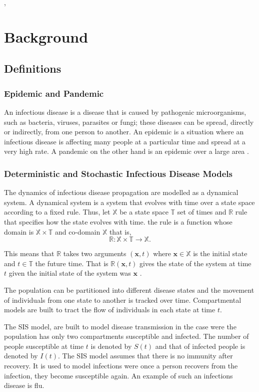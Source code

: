 ,\chapter{Background}

\section{Definitions}
\subsection{Epidemic and Pandemic }
An infectious disease is a disease that is caused by pathogenic microorganisms, such as bacteria, viruses, parasites or fungi; these diseases can be spread, directly or indirectly, from one person to another. An epidemic is a situation where an infectious disease is affecting many people at a particular time and spread at a very high rate. A pandemic on the other hand
is an epidemic over a large area \citep{morens2009pandemic}.

\subsection{Deterministic and Stochastic Infectious Disease Models}
The dynamics of infectious disease propagation are modelled as a dynamical system. A dynamical system is a system that evolves with time over a state space according to a fixed rule. Thus, let $\mathbb{X}$ be a state space $\mathbb{T}$ set of times and $\mathbb{R}$ rule that specifies how the state evolves with time. the rule is a function  whose domain is $\mathbb{X} \times  \mathbb{T}$ and co-domain $\mathbb{X}$ that is,
\begin{equation*}
\mathbb{R}: \mathbb{X}  \times \mathbb{T} \longrightarrow \mathbb{X}.
\end{equation*}

This means that $\mathbb{R}$ takes two arguments $ (\textbf{x},t)$ where $\textbf{x} \in \mathbb{X}$ is the initial state and $t \in \mathbb{T}$ the future time. That is $\mathbb{R} (\textbf{x},t)$ gives the state of the system at time $t$ given the initial state of the system was $\textbf{x}$ \citep{DQ}.

The population can be partitioned into different disease states and the movement of individuals from one state to another is tracked over time. Compartmental models are built to tract the flow of individuals in each state at time $t$.


The SIS model, are built to model disease transmission in the case were the population has only two compartments susceptible and infected. The number of people susceptible  at time $t$ is denoted by $S(t)$ and that of infected people is denoted by $I(t)$. The SIS model assumes that there is no immunity after recovery. It is used to model infections were once a person recovers from the infection, they become susceptible again. An example of such an infections disease is flu.

